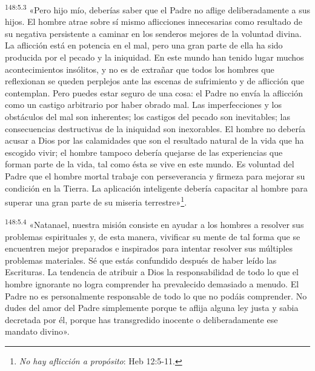 \par 
\textsuperscript{148:5.3} «Pero hijo mío, deberías saber que el Padre no aflige deliberadamente a sus hijos. El hombre atrae sobre sí mismo aflicciones innecesarias como resultado de su negativa persistente a caminar en los senderos mejores de la voluntad divina. La aflicción está en potencia en el mal, pero una gran parte de ella ha sido producida por el pecado y la iniquidad. En este mundo han tenido lugar muchos acontecimientos insólitos, y no es de extrañar que todos los hombres que reflexionan se queden perplejos ante las escenas de sufrimiento y de aflicción que contemplan. Pero puedes estar seguro de una cosa: el Padre no envía la aflicción como un castigo arbitrario por haber obrado mal. Las imperfecciones y los obstáculos del mal son inherentes; los castigos del pecado son inevitables; las consecuencias destructivas de la iniquidad son inexorables. El hombre no debería acusar a Dios por las calamidades que son el resultado natural de la vida que ha escogido vivir; el hombre tampoco debería quejarse de las experiencias que forman parte de la vida, tal como ésta se vive en este mundo. Es voluntad del Padre que el hombre mortal trabaje con perseverancia y firmeza para mejorar su condición en la Tierra. La aplicación inteligente debería capacitar al hombre para superar una gran parte de su miseria terrestre»\footnote{\textit{No hay aflicción a propósito}: Heb 12:5-11.}.

\par 
\textsuperscript{148:5.4} «Natanael, nuestra misión consiste en ayudar a los hombres a resolver sus problemas espirituales y, de esta manera, vivificar su mente de tal forma que se encuentren mejor preparados e inspirados para intentar resolver sus múltiples problemas materiales. Sé que estás confundido después de haber leído las Escrituras. La tendencia de atribuir a Dios la responsabilidad de todo lo que el hombre ignorante no logra comprender ha prevalecido demasiado a menudo. El Padre no es personalmente responsable de todo lo que no podáis comprender. No dudes del amor del Padre simplemente porque te aflija alguna ley justa y sabia decretada por él, porque has transgredido inocente o deliberadamente ese mandato divino».

